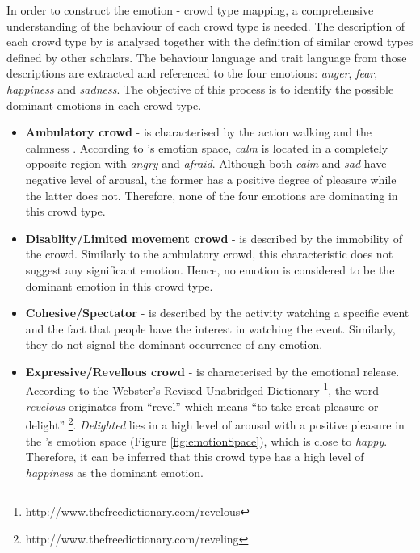 In order to construct the emotion - crowd type mapping, a comprehensive understanding of the behaviour of each crowd type is needed. The description of each crowd type by \citet{Berlonghi1995} is analysed together with the definition of similar crowd types defined by other scholars. The behaviour language and trait language from those descriptions are extracted and referenced to the four emotions: \textit{anger}, \textit{fear}, \textit{happiness} and \textit{sadness}. The objective of this process is to identify the possible dominant emotions in each crowd type. 

\begin{itemize}
\item \textbf{Ambulatory crowd} - is characterised by the action walking and the calmness \citep{Zeitz2009}. According to \citet{russell1980circumplex}'s emotion space, \textit{calm} is located in a completely opposite region with \textit{angry} and \textit{afraid}. Although both \textit{calm} and \textit{sad} have negative level of arousal, the former has a positive degree of pleasure while the latter does not. Therefore, none of the four emotions are dominating in this crowd type.

\item \textbf{Disablity/Limited movement crowd} - is described by the immobility of the crowd. Similarly to the ambulatory crowd, this characteristic does not suggest any significant emotion. Hence, no emotion is considered to be the dominant emotion in this crowd type.

\item \textbf{Cohesive/Spectator} - is described by the activity watching a specific event and the fact that people have the interest in watching the event. Similarly, they do not signal the dominant occurrence of any emotion.

\item \textbf{Expressive/Revellous crowd} - is characterised by the emotional release. According to the Webster's Revised Unabridged Dictionary \footnote{http://www.thefreedictionary.com/revelous}, the word \textit{revelous} originates from ``revel'' which means ``to take great pleasure or delight'' \footnote{http://www.thefreedictionary.com/reveling}. \textit{Delighted} lies in a high level of arousal with a positive pleasure in the \citet{russell1980circumplex}'s emotion space (Figure \ref{fig:emotionSpace}), which is close to \textit{happy}. Therefore, it can be inferred that this crowd type has a high level of \textit{happiness} as the dominant emotion.


\end{itemize}
